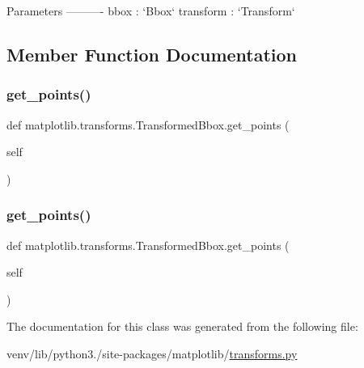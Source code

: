 \begin{DoxyVerb}Parameters
----------
bbox : `Bbox`
transform : `Transform`
\end{DoxyVerb}
 

\subsection{Member Function Documentation}
\mbox{\label{classmatplotlib_1_1transforms_1_1TransformedBbox_afe8d0aadf2c8751caa2a4fedb9702307}} 
\subsubsection{\texorpdfstring{get\+\_\+points()}{get\_points()}\hspace{0.1cm}{\footnotesize\ttfamily [1/2]}}
{\footnotesize\ttfamily def matplotlib.\+transforms.\+Transformed\+Bbox.\+get\+\_\+points (\begin{DoxyParamCaption}\item[{}]{self }\end{DoxyParamCaption})}

\mbox{\label{classmatplotlib_1_1transforms_1_1TransformedBbox_afe8d0aadf2c8751caa2a4fedb9702307}} 
\subsubsection{\texorpdfstring{get\+\_\+points()}{get\_points()}\hspace{0.1cm}{\footnotesize\ttfamily [2/2]}}
{\footnotesize\ttfamily def matplotlib.\+transforms.\+Transformed\+Bbox.\+get\+\_\+points (\begin{DoxyParamCaption}\item[{}]{self }\end{DoxyParamCaption})}



The documentation for this class was generated from the following file\+:\begin{DoxyCompactItemize}
\item 
venv/lib/python3./site-\/packages/matplotlib/\hyperlink{transforms_8py}{transforms.\+py}\end{DoxyCompactItemize}

